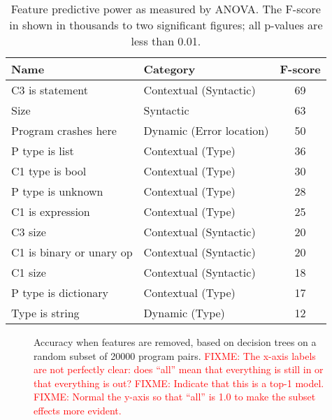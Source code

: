 \documentclass[conference]{IEEEtran}
\newcommand{\fixme}[1]{\textcolor{red}{FIXME: #1}}
\begin{document}
\begin{table}[]
\begin{center}
\begin{tabular}{llc}
Name                     & Category                & F-score \\ \bottomrule
C3 is statement          & Contextual (Syntactic)  & 69 \\
Size                     & Syntactic               & 63 \\
Program crashes here     & Dynamic (Error location)& 50 \\
P type is list           & Contextual (Type)       & 36 \\
C1 type is bool          & Contextual (Type)       & 30 \\
P type is unknown        & Contextual (Type)       & 28 \\
C1 is expression         & Contextual (Type)       & 25 \\
C3 size                  & Contextual (Syntactic)  & 20 \\
C1 is binary or unary op & Contextual (Syntactic)  & 20 \\
C1 size                  & Contextual (Syntactic)  & 18 \\
P type is dictionary     & Contextual (Type)       & 17 \\
Type is string           & Dynamic (Type)          & 12 \\
\toprule
\end{tabular}
\end{center}
\caption{Feature predictive power as measured by ANOVA.  The F-score in
shown in
thousands to two significant figures; all p-values are less than 0.01.}
\label{tab-anova}
\end{table}

\begin{figure}
\caption{Accuracy when features are removed, based on decision trees on a
random subset of 20000 program pairs.
\fixme{The x-axis labels are not perfectly clear: does ``all'' mean that
everything is still in or that everything is out?}
\fixme{Indicate that this is a top-1 model.}
\fixme{Normal the y-axis so that ``all'' is 1.0 to make the subset effects
more evident.}
}
\label{fig-removing-features}
\end{figure}
\end{document}
